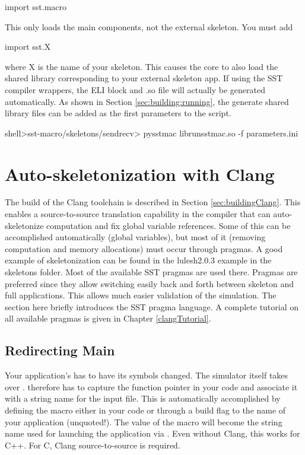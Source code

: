 \begin{ViFile}
import sst.macro
\end{ViFile}
This only loads the main components, not the external skeleton. You must add

\begin{ViFile}
import sst.X
\end{ViFile}
where X is the name of your skeleton. This causes the core to also load the shared library corresponding to your external skeleton app.
If using the SST compiler wrappers, the ELI block and .so file will actually be generated automatically.  As shown in Section \ref{sec:building:running},
the generate shared library files can be added as the first parameters to the  script.

\begin{ShellCmd}
shell>sst-macro/skeletons/sendrecv> pysstmac librunsstmac.so -f parameters.ini
\end{ShellCmd} 

\section{Auto-skeletonization with Clang}
\label{sec:autoSkeletonization}

The build of the Clang toolchain is described in Section \ref{sec:buildingClang}. 
This enables a source-to-source translation capability in the  compiler that can auto-skeletonize computation and fix global variable references.
Some of this can be accomplished automatically (global variables), but most of it (removing computation and memory allocations) must occur through pragmas.
A good example of skeletonization can be found in the lulesh2.0.3 example in the skeletons folder. Most of the available SST pragmas are used there.
Pragmas are preferred since they allow switching easily back and forth between skeleton and full applications.
This allows much easier validation of the simulation. The section here briefly introduces the SST pragma language.
A complete tutorial on all available pragmas is given in Chapter \ref{clangTutorial}.

\subsection{Redirecting Main}
Your application's  has to have its symbols changed.
The simulator itself takes over .
\sstmacro therefore has to capture the function pointer in your code and associate it with a string name for the input file.
This is automatically accomplished by defining the macro  either in your code or through a  build flag to the name of your application (unquoted!). The value of the macro will become the string name used for launching the application via .
Even without Clang, this works for C++. For C, Clang source-to-source is required.

